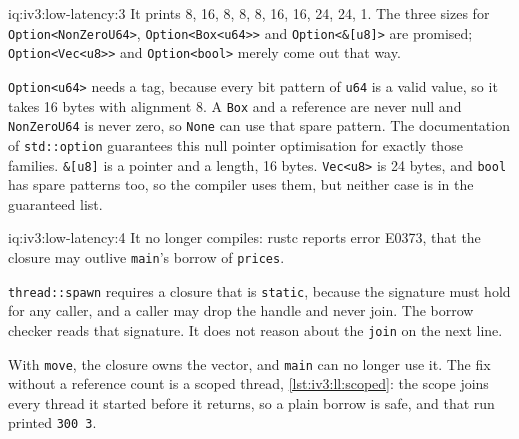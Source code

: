 \begin{solution}{iq:iv3:low-latency:3}
It prints 8, 16, 8, 8, 8, 16, 16, 24, 24, 1. The three sizes for \texttt{Option<NonZeroU64>}, \texttt{Option<Box<u64>{}>} and \texttt{Option<\&[u8]>} are promised; \texttt{Option<Vec<u8>{}>} and \texttt{Option<bool>} merely come out that way.

\texttt{Option<u64>} needs a tag, because every bit pattern of \texttt{u64} is a valid value, so it takes 16 bytes with alignment 8. A \texttt{Box} and a reference are never null and \texttt{NonZeroU64} is never zero, so \texttt{None} can use that spare pattern. The documentation of \texttt{std::option} guarantees this null pointer optimisation for exactly those families. \texttt{\&[u8]} is a pointer and a length, 16 bytes. \texttt{Vec<u8>} is 24 bytes, and \texttt{bool} has spare patterns too, so the compiler uses them, but neither case is in the guaranteed list.

\end{solution}

\begin{solution}{iq:iv3:low-latency:4}
It no longer compiles: rustc reports error E0373, that the closure may outlive \texttt{main}'s borrow of \texttt{prices}.

\texttt{thread::spawn} requires a closure that is \texttt{\textquotesingle{}static}, because the signature must hold for any caller, and a caller may drop the handle and never join. The borrow checker reads that signature. It does not reason about the \texttt{join} on the next line.

With \texttt{move}, the closure owns the vector, and \texttt{main} can no longer use it. The fix without a reference count is a scoped thread, \cref{lst:iv3:ll:scoped}: the scope joins every thread it started before it returns, so a plain borrow is safe, and that run printed \texttt{300 3}.
\enlargethispage{-6\baselineskip}%
\label{lst:iv3:ll:scoped}
\end{solution}

